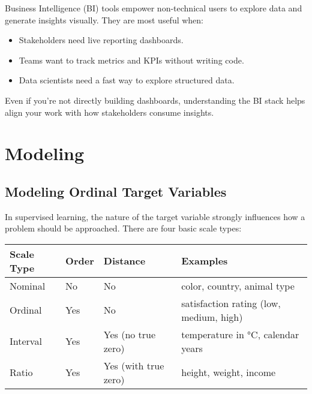 \documentclass[12pt,openany]{book}
\begin{document}
Business Intelligence (BI) tools empower non-technical users to explore data and generate insights visually. They are most useful when:

\begin{itemize}
    \item Stakeholders need live reporting dashboards.
    \item Teams want to track metrics and KPIs without writing code.
    \item Data scientists need a fast way to explore structured data.
\end{itemize}

\begin{notebox}
Even if you're not directly building dashboards, understanding the BI stack helps align your work with how stakeholders consume insights.
\end{notebox}





\part{Modeling}



\chapter{Modeling Ordinal Target Variables}

In supervised learning, the nature of the target variable strongly influences
how a problem should be approached. There are four basic scale types:
\newline

\begin{minipage}{\textwidth}
\centering
\renewcommand{\arraystretch}{1.3} %
\begin{tabular}{m{2.5cm} m{1.5cm} m{4cm} m{7cm}}
\toprule
\textbf{Scale Type} & \textbf{Order} & \textbf{Distance} & \textbf{Examples} \\
\midrule
Nominal   & No  & No  & color, country, animal type \\
Ordinal   & Yes & No  & satisfaction rating (low, medium, high) \\
Interval  & Yes & Yes (no true zero)  & temperature in °C, calendar years \\
Ratio     & Yes & Yes (with true zero) & height, weight, income \\
\bottomrule
\end{tabular}
\end{minipage}
\vspace{5pt}
\end{document}

